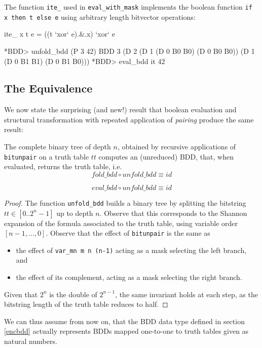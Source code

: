 \documentclass[]{INCLUDES/llncs}
\begin{document}
The function {\tt ite\_} used in {\tt eval\_with\_mask} 
implements the boolean function  {\tt if x then t else e}
using arbitrary length bitvector operations:
\begin{code}
ite_ x t e = ((t `xor` e).&.x) `xor` e
\end{code}


\begin{codex}
*BDD> unfold_bdd (P 3 42)
BDD 3 (D 2 (D 1 (D 0 B0 B0) (D 0 B0 B0)) 
           (D 1 (D 0 B1 B1) (D 0 B1 B0)))
*BDD> eval_bdd it
42
\end{codex}

\subsection{The Equivalence}
We now state the surprising (and new!) result
that boolean evaluation and structural transformation with
repeated application of
{\em pairing}
produce the same result:

\begin{prop} \label{tt}
The complete binary tree of depth $n$, obtained by recursive 
applications of {\tt bitunpair} on a truth table $tt$
computes an (unreduced) BDD, that, when evaluated, 
returns the truth table, i.e.
\begin{equation}
fold\_bdd \circ unfold\_bdd \equiv id
\end{equation}

\begin{equation}
eval\_bdd \circ unfold\_bdd \equiv id
\end{equation}
\end{prop}
\begin{proof} The function {\tt unfold\_bdd} builds a
binary tree by splitting the bitstring $tt \in [0..2^n-1]$ up to depth $n$. 
Observe that this corresponds to the Shannon expansion \cite{shannon_all} of the
formula associated to the truth table, using variable order $[n-1,...,0]$.
Observe that the effect of {\tt bitunpair} is the same as
\begin{itemize}
  \item the effect of {\tt var\_mn m n (n-1)} 
     acting as a mask selecting the left branch, and
\item 
     the effect of its complement, acting as a mask selecting the right
     branch.
\end{itemize}
Given that $2^n$ is the double of $2^{n-1}$, the same invariant holds at each
step, as the bitstring length of the truth table reduces to half. 
\end{proof}
We can thus assume from now on, that the BDD data type defined in
section \ref{encbdd} actually represents BDDs mapped one-to-one to truth tables
given as natural numbers.
\end{document}
